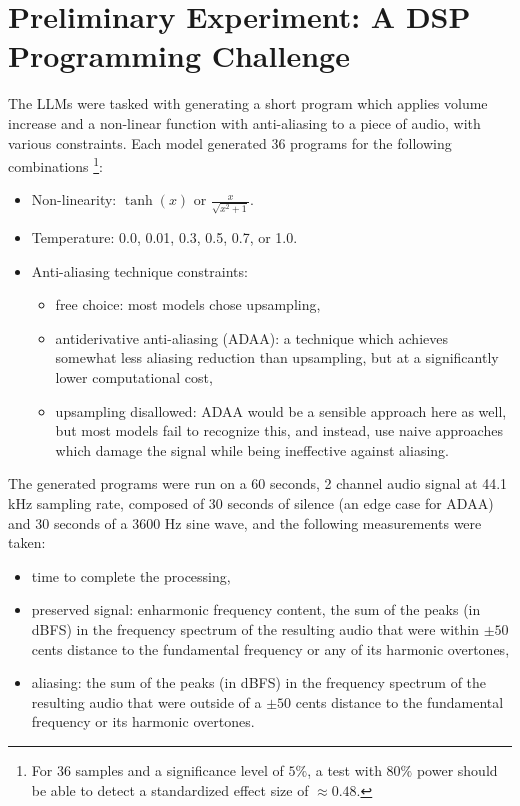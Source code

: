 \documentclass[noindent,nohyp,parspace,titlepage,twoside,12pt]{article}
\begin{document}
\clearpage

  \section{Preliminary Experiment: A DSP Programming Challenge}

    The LLMs were tasked with generating a short program which applies volume
    increase and a non-linear function with anti-aliasing to a piece of audio,
    with various constraints. Each model generated 36 programs for the
    following combinations \footnote{For 36 samples and a significance level of
    $5\%$, a test with $80\%$ power should be able to detect a standardized
    effect size of $\approx 0.48$.}:

    \begin{itemize}
      \item Non-linearity: $\tanh(x)$ or $\frac{x}{\sqrt{x^2 + 1}}$.
      \item Temperature: 0.0, 0.01, 0.3, 0.5, 0.7, or 1.0.
      \item Anti-aliasing technique constraints:
            \begin{itemize}
              \item free choice: most models chose upsampling,
              \item antiderivative anti-aliasing \cite{adaa} (ADAA): a
                    technique which achieves somewhat less aliasing reduction
                    than upsampling, but at a significantly lower
                    computational cost,
              \item upsampling disallowed: ADAA would be a sensible approach
                    here as well, but most models fail to recognize this, and
                    instead, use naive approaches which damage the signal
                    while being ineffective against aliasing.
            \end{itemize}
    \end{itemize}

    The generated programs were run on a 60 seconds, 2 channel audio signal at
    44.1 kHz sampling rate, composed of 30 seconds of silence (an edge case
    for ADAA) and 30 seconds of a 3600 Hz sine wave, and the following
    measurements were taken:

    \begin{itemize}
      \item time to complete the processing,
      \item preserved signal: enharmonic frequency content, the sum of the
            peaks (in dBFS) in the frequency spectrum of the resulting audio
            that were within $\pm50$ cents distance to the fundamental
            frequency or any of its harmonic overtones,
      \item aliasing: the sum of the peaks (in dBFS) in the frequency
            spectrum of the resulting audio that were outside of a $\pm50$
            cents distance to the fundamental frequency or its harmonic
            overtones.
    \end{itemize}
\end{document}
